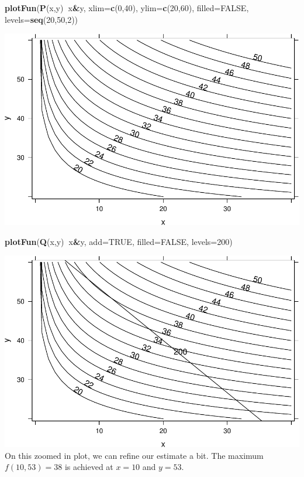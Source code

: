 \documentclass[
]{book}
\newenvironment{Shaded}{\begin{snugshade}}{\end{snugshade}}
\newcommand{\DataTypeTok}[1]{\textcolor[rgb]{0.13,0.29,0.53}{#1}}
\newcommand{\DecValTok}[1]{\textcolor[rgb]{0.00,0.00,0.81}{#1}}
\newcommand{\KeywordTok}[1]{\textcolor[rgb]{0.13,0.29,0.53}{\textbf{#1}}}
\newcommand{\NormalTok}[1]{#1}
\newcommand{\OperatorTok}[1]{\textcolor[rgb]{0.81,0.36,0.00}{\textbf{#1}}}
\newcommand{\OtherTok}[1]{\textcolor[rgb]{0.56,0.35,0.01}{#1}}
\begin{document}
\begin{Shaded}
\begin{Highlighting}[]
\KeywordTok{plotFun}\NormalTok{(}\KeywordTok{P}\NormalTok{(x,y)}\OperatorTok{~}\NormalTok{x}\OperatorTok{&}\NormalTok{y, }\DataTypeTok{xlim=}\KeywordTok{c}\NormalTok{(}\DecValTok{0}\NormalTok{,}\DecValTok{40}\NormalTok{), }\DataTypeTok{ylim=}\KeywordTok{c}\NormalTok{(}\DecValTok{20}\NormalTok{,}\DecValTok{60}\NormalTok{), }\DataTypeTok{filled=}\OtherTok{FALSE}\NormalTok{, }\DataTypeTok{levels=}\KeywordTok{seq}\NormalTok{(}\DecValTok{20}\NormalTok{,}\DecValTok{50}\NormalTok{,}\DecValTok{2}\NormalTok{))}
\end{Highlighting}
\end{Shaded}

\includegraphics{_bookdown_files/math135_handbook_files/figure-latex/unnamed-chunk-54-1.pdf}

\begin{Shaded}
\begin{Highlighting}[]
\KeywordTok{plotFun}\NormalTok{(}\KeywordTok{Q}\NormalTok{(x,y)}\OperatorTok{~}\NormalTok{x}\OperatorTok{&}\NormalTok{y, }\DataTypeTok{add=}\OtherTok{TRUE}\NormalTok{, }\DataTypeTok{filled=}\OtherTok{FALSE}\NormalTok{, }\DataTypeTok{levels=}\DecValTok{200}\NormalTok{)}
\end{Highlighting}
\end{Shaded}

\includegraphics{_bookdown_files/math135_handbook_files/figure-latex/unnamed-chunk-54-2.pdf}
On this zoomed in plot, we can refine our estimate a bit. The maximum \(f(10,53)=38\) is achieved at \(x=10\) and \(y=53\).
\end{document}
